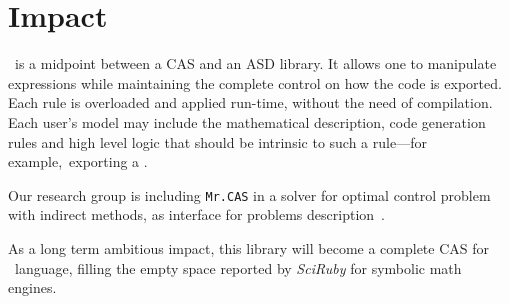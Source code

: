 
\section{Impact}
\label{sec:impact}

\ragnicas~is a midpoint between a CAS and an ASD library. It allows one to manipulate expressions while maintaining the complete control on how the code is exported. Each rule is overloaded and applied run-time, without the need of compilation. Each user's model may include the mathematical description, code generation rules and high level logic that should be intrinsic to such a rule---for example,~exporting a .

Our research group is including \texttt{Mr.CAS} in a solver for optimal control problem with indirect methods, as interface for problems description~\cite{biral2016notes}.

As a long term ambitious impact, this library will become a complete CAS for \Ruby~language, filling the empty space reported by \emph{SciRuby} for symbolic math engines.
